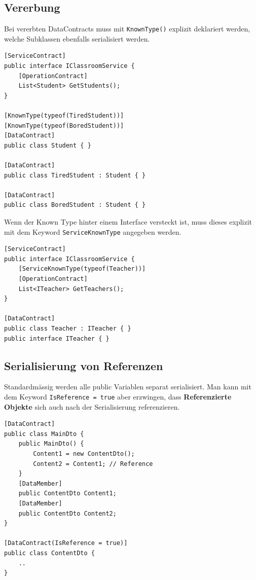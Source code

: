 \subsection{Vererbung}
Bei vererbten DataContracts muss mit \lstinline|KnownType()| explizit deklariert werden, welche Subklassen ebenfalls serialisiert werden.
\begin{lstlisting}[caption=Data Contract Vererbung]
[ServiceContract]
public interface IClassroomService {
	[OperationContract]
	List<Student> GetStudents();
}

[KnownType(typeof(TiredStudent))]
[KnownType(typeof(BoredStudent))]
[DataContract]
public class Student { }

[DataContract]
public class TiredStudent : Student { }

[DataContract]
public class BoredStudent : Student { }
\end{lstlisting}

Wenn der Known Type hinter einem Interface versteckt ist, muss dieses explizit mit dem Keyword \lstinline|ServiceKnownType| angegeben werden.
\begin{lstlisting}[caption=Service Known Data Contract Vererbung]
[ServiceContract]
public interface IClassroomService {
	[ServiceKnownType(typeof(Teacher))]
	[OperationContract]
	List<ITeacher> GetTeachers();
}

[DataContract]
public class Teacher : ITeacher { }
public interface ITeacher { }
\end{lstlisting}

\clearpage

\subsection{Serialisierung von Referenzen}
Standardmässig werden alle public Variablen separat serialisiert. Man kann mit dem Keyword \lstinline|IsReference = true| aber erzwingen, dass \textbf{Referenzierte Objekte} sich auch nach der Serialisierung referenzieren.
\begin{lstlisting}[caption=Serialisierung von Referenzen]
[DataContract]
public class MainDto {
	public MainDto() {
		Content1 = new ContentDto();
		Content2 = Content1; // Reference
	}
	[DataMember] 
	public ContentDto Content1;
	[DataMember] 
	public ContentDto Content2;
}

[DataContract(IsReference = true)]
public class ContentDto { 
	.. 
}
\end{lstlisting}

